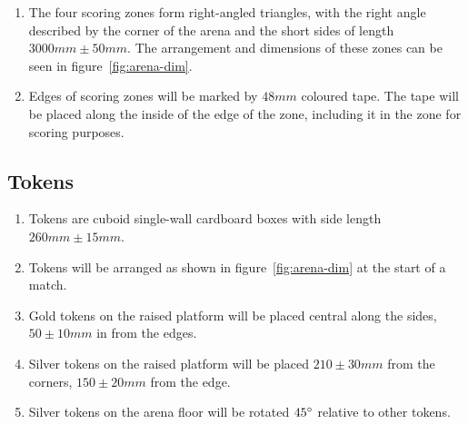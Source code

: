 \begin{enumerate}
\item The four scoring zones form right-angled triangles, with the right angle described by the corner of the arena and the short sides of length $3000mm \pm 50mm$.
      The arrangement and dimensions of these zones can be seen in figure~\ref{fig:arena-dim}.

\item Edges of scoring zones will be marked by $48mm$ coloured tape.
      The tape will be placed along the inside of the edge of the zone, including it in the zone for scoring purposes.
\end{enumerate}

\subsection{Tokens}
\label{sub:Tokens}
\begin{enumerate}
\item Tokens are cuboid single-wall cardboard boxes with side length $260mm \pm 15mm$.

\item Tokens will be arranged as shown in figure~\ref{fig:arena-dim} at the start of a match.

\item Gold tokens on the raised platform will be placed central along the sides,  $50 \pm 10 mm$ in from the edges.

\item Silver tokens on the raised platform will be placed $210 \pm 30 mm$ from the corners, $150 \pm 20 mm$ from the edge.

\item Silver tokens on the arena floor will be rotated $45\degree$ relative to other tokens.

\end{enumerate}

\clearpage
